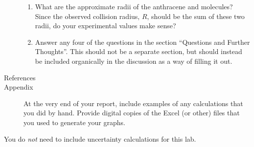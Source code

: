 \begin{description}
\begin{enumerate}
		\item What are the approximate radii of the anthracene and  molecules? 
		Since the observed collision radius, \( R \), should be the sum of these two radii, do your experimental values make sense?
		\item Answer any four of the questions in the section ``Questions and Further Thoughts''. This should not be a separate section, but should instead be included organically in the discussion as a way of filling it out.
	\end{enumerate}
	\item[References]
	\item[Appendix] At the very end of your report, include examples of any calculations that you did by hand. 
	Provide digital copies of the Excel (or other) files that you used to generate your graphs.
\end{description}

\noindent You do \emph{not} need to include uncertainty calculations for this lab. 

